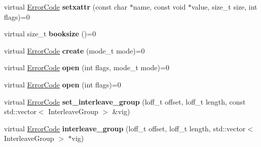 \begin{DoxyCompactItemize}
\item 
virtual \hyperlink{group__ERRORCODES_ga6263a3c9a0b8d36aea21cdd835ac99fe}{Error\+Code} {\bfseries setxattr} (const char $\ast$name, const void $\ast$value, size\+\_\+t size, int flags)=0\hypertarget{classalps_1_1RegionFile_a6f39ed54e11e78196fefdae39fe124cb}{}\label{classalps_1_1RegionFile_a6f39ed54e11e78196fefdae39fe124cb}

\item 
virtual size\+\_\+t {\bfseries booksize} ()=0\hypertarget{classalps_1_1RegionFile_aeaacd93f0bbb9fa9f0d27a7c743b91b5}{}\label{classalps_1_1RegionFile_aeaacd93f0bbb9fa9f0d27a7c743b91b5}

\item 
virtual \hyperlink{group__ERRORCODES_ga6263a3c9a0b8d36aea21cdd835ac99fe}{Error\+Code} {\bfseries create} (mode\+\_\+t mode)=0\hypertarget{classalps_1_1RegionFile_a5e8d30c5750eeda8d90778b57719a4e2}{}\label{classalps_1_1RegionFile_a5e8d30c5750eeda8d90778b57719a4e2}

\item 
virtual \hyperlink{group__ERRORCODES_ga6263a3c9a0b8d36aea21cdd835ac99fe}{Error\+Code} {\bfseries open} (int flags, mode\+\_\+t mode)=0\hypertarget{classalps_1_1RegionFile_af452bd729854c0ed2b37a7e18ce9b559}{}\label{classalps_1_1RegionFile_af452bd729854c0ed2b37a7e18ce9b559}

\item 
virtual \hyperlink{group__ERRORCODES_ga6263a3c9a0b8d36aea21cdd835ac99fe}{Error\+Code} {\bfseries open} (int flags)=0\hypertarget{classalps_1_1RegionFile_a906925033130d1fa0cc679b4d497c6e2}{}\label{classalps_1_1RegionFile_a906925033130d1fa0cc679b4d497c6e2}

\item 
virtual \hyperlink{group__ERRORCODES_ga6263a3c9a0b8d36aea21cdd835ac99fe}{Error\+Code} {\bfseries set\+\_\+interleave\+\_\+group} (loff\+\_\+t offset, loff\+\_\+t length, const std\+::vector$<$ Interleave\+Group $>$ \&vig)\hypertarget{classalps_1_1RegionFile_a6c291d58ef854587c8e50f6e3e3a8f88}{}\label{classalps_1_1RegionFile_a6c291d58ef854587c8e50f6e3e3a8f88}

\item 
virtual \hyperlink{group__ERRORCODES_ga6263a3c9a0b8d36aea21cdd835ac99fe}{Error\+Code} {\bfseries interleave\+\_\+group} (loff\+\_\+t offset, loff\+\_\+t length, std\+::vector$<$ Interleave\+Group $>$ $\ast$vig)\hypertarget{classalps_1_1RegionFile_a62642f3729211b7e02239f6d099ab3e8}{}\label{classalps_1_1RegionFile_a62642f3729211b7e02239f6d099ab3e8}

\end{DoxyCompactItemize}
